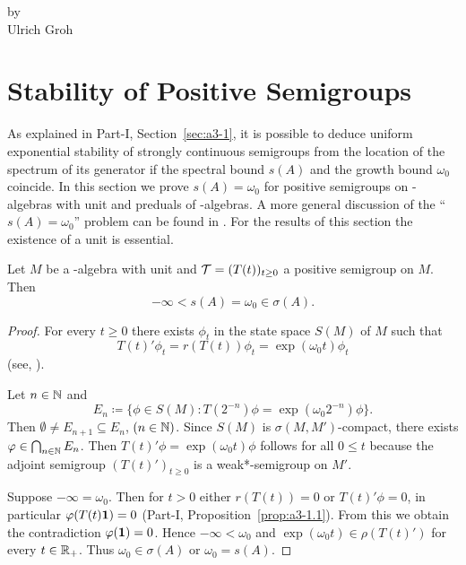 \label{chap:d4}
\thispagestyle{empty}
{\Large
\vspace*{-.75cm}
by \\[.25em]
Ulrich Groh
\vspace{.75cm}
\\
}
\section{Stability of Positive Semigroups}\label{sec:d4-1}
As explained in Part-I, Section~\ref{sec:a3-1}, it is possible to deduce uniform exponential stability of strongly continuous semigroups from the location of the spectrum of its generator if the spectral bound $ s(A) $ and the growth bound $ \omega_{0} $ coincide.
In this section we prove $s(A) = \omega_{0}$ for positive semigroups on \CA-algebras with unit and preduals of \WA-algebras.
A more general discussion of the \enquote{$s(A) = \omega_{0}$} problem can be found in \textcite{greinervoigtwolff:1981}.
For the results of this section the existence of a unit is essential.
\begin{theorem}\label{thm:d4-1.1}
Let $M$ be a \CA-algebra with unit and $\TT = (T(t))_{t \geq 0}$ a positive semigroup on $M$.
Then
\[
	-\infty < s(A) = \omega_{0} \in \sigma(A).
\]
\end{theorem}
\begin{proof}
For every  $t \geq 0 $ there exists $\phi_{t}$ in the state space $S(M)$ of\/ $M$ such that
\[
	T(t)'\phi_{t} = r(T(t))\phi_{t} = \exp(\omega_{0} t)\phi_{t}
\]
(see, \eg \textcite[2.1]{groh:1981}).

Let $n \in \mathbb{N}$ and
\[
	E_{n} \coloneqq \{\phi \in S(M) \colon T(2^{-n})\phi = \exp(\omega_{0} 2^{-n})\phi \}.
\]
Then $\emptyset \neq E_{n+1} \subseteq E_{n}$,  $(n \in \mathbb{N})$.
Since $S(M)$ is $\sigma(M,M')$-compact, there exists $\phi \in \bigcap_{n \in \N} E_{n}$.
Then $ T(t)'\phi = \exp(\omega_{0} t)\phi$ follows for all $ 0 \leq t $ because the adjoint semigroup $(T(t)')_{t \geq 0}$ is a weak*-semigroup on $M'$.

Suppose $-\infty = \omega_{0}$.
Then for $t > 0$ either $r(T(t)) = 0$  or $T(t)'\phi = 0$, in particular $\phi(T(t)\1) = 0$ (Part-I, Proposition~\ref{prop:a3-1.1}).
From this we obtain the contradiction $\phi(\1) = 0$.
Hence $-\infty < \omega_{0}$ and $\exp(\omega_{0} t) \in \rho(T(t)')$ for every $t \in \mathbb{R}_{+}$.
Thus $\omega_{0} \in \sigma(A)$ or $\omega_{0} = s(A)$.
\end{proof}
